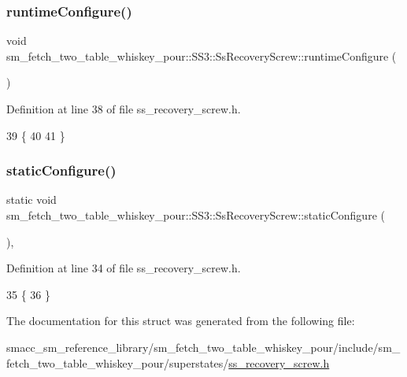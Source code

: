 \subsubsection{\texorpdfstring{runtime\+Configure()}{runtimeConfigure()}}
{\footnotesize\ttfamily void sm\+\_\+fetch\+\_\+two\+\_\+table\+\_\+whiskey\+\_\+pour\+::\+S\+S3\+::\+Ss\+Recovery\+Screw\+::runtime\+Configure (\begin{DoxyParamCaption}{ }\end{DoxyParamCaption})\hspace{0.3cm}{\ttfamily [inline]}}



Definition at line 38 of file ss\+\_\+recovery\+\_\+screw.\+h.


\begin{DoxyCode}
39             \{
40                 
41             \}
\end{DoxyCode}
\mbox{\label{structsm__fetch__two__table__whiskey__pour_1_1SS3_1_1SsRecoveryScrew_a6bfc035c0ca394ff32d4e243a5bbb5c8}} 
\subsubsection{\texorpdfstring{static\+Configure()}{staticConfigure()}}
{\footnotesize\ttfamily static void sm\+\_\+fetch\+\_\+two\+\_\+table\+\_\+whiskey\+\_\+pour\+::\+S\+S3\+::\+Ss\+Recovery\+Screw\+::static\+Configure (\begin{DoxyParamCaption}{ }\end{DoxyParamCaption})\hspace{0.3cm}{\ttfamily [inline]}, {\ttfamily [static]}}



Definition at line 34 of file ss\+\_\+recovery\+\_\+screw.\+h.


\begin{DoxyCode}
35             \{
36             \}
\end{DoxyCode}


The documentation for this struct was generated from the following file\+:\begin{DoxyCompactItemize}
\item 
smacc\+\_\+sm\+\_\+reference\+\_\+library/sm\+\_\+fetch\+\_\+two\+\_\+table\+\_\+whiskey\+\_\+pour/include/sm\+\_\+fetch\+\_\+two\+\_\+table\+\_\+whiskey\+\_\+pour/superstates/\hyperlink{ss__recovery__screw_8h}{ss\+\_\+recovery\+\_\+screw.\+h}\end{DoxyCompactItemize}
